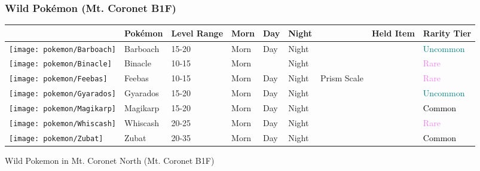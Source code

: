 \subsubsection{Wild Pokémon (Mt. Coronet B1F)}%
\label{ssubsec:WildPokmon(Mt.CoronetB1F)}%
\begin{longtable}{||l l l l l l l l l||}%
\hline%
&Pokémon&Level Range&Morn&Day&Night&&Held Item&Rarity Tier\\%
\hline%
\endhead%
\hline%
\texttt{[image: pokemon/Barboach]}&Barboach&15{-}20&Morn&Day&Night&&&\textcolor{teal}{%
Uncommon%
}\\%
\hline%
\texttt{[image: pokemon/Binacle]}&Binacle&10{-}15&Morn&&Night&&&\textcolor{violet}{%
Rare%
}\\%
\hline%
\texttt{[image: pokemon/Feebas]}&Feebas&10{-}15&Morn&Day&Night&Prism Scale&&\textcolor{violet}{%
Rare%
}\\%
\hline%
\texttt{[image: pokemon/Gyarados]}&Gyarados&15{-}20&Morn&Day&Night&&&\textcolor{teal}{%
Uncommon%
}\\%
\hline%
\texttt{[image: pokemon/Magikarp]}&Magikarp&15{-}20&Morn&Day&Night&&&\textcolor{black}{%
Common%
}\\%
\hline%
\texttt{[image: pokemon/Whiscash]}&Whiscash&20{-}25&Morn&Day&Night&&&\textcolor{violet}{%
Rare%
}\\%
\hline%
\texttt{[image: pokemon/Zubat]}&Zubat&20{-}35&Morn&Day&Night&&&\textcolor{black}{%
Common%
}\\%
\hline%
\end{longtable}%
\caption{Wild Pokemon in Mt. Coronet North (Mt. Coronet B1F)}
